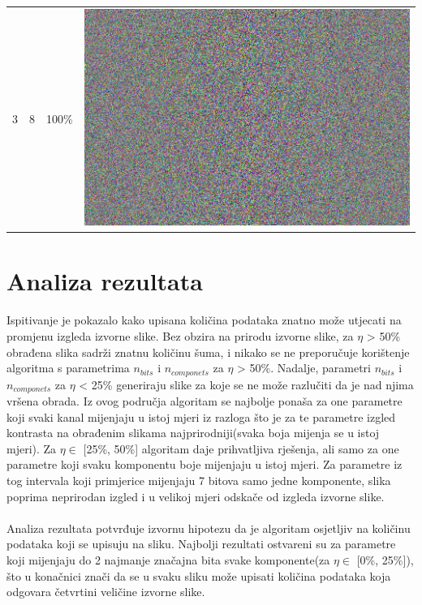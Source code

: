 \documentclass[times, utf8, seminar]{fer}
\begin{document}
\begin{center}
\begin{longtable}{|c|c|c|c|}
3 & 8 &100\% & \includegraphics[scale=0.3]{../benchmark_results/pattern/3_components-8_bits.png} \\
\end{longtable}
\end{center}

\section{Analiza rezultata}
\paragraph{}
Ispitivanje je pokazalo kako upisana količina podataka znatno može utjecati na promjenu izgleda izvorne slike. Bez obzira na prirodu izvorne slike, za $\eta$ > 50\% obrađena slika sadrži znatnu količinu šuma, i nikako se ne preporučuje korištenje algoritma s parametrima $n_{bits}$ i $n_{componets}$ za $\eta$ > 50\%. Nadalje, parametri $n_{bits}$ i $n_{componets}$ za $\eta$ < 25\% generiraju slike za koje se ne može razlučiti da je nad njima vršena obrada. Iz ovog područja algoritam se najbolje ponaša za one parametre koji svaki kanal mijenjaju u istoj mjeri iz razloga što je za te parametre izgled kontrasta na obrađenim slikama najprirodniji(svaka boja mijenja se u istoj mjeri). Za $\eta \in$ [25\%, 50\%] algoritam daje prihvatljiva rješenja, ali samo za one parametre koji svaku komponentu boje mijenjaju u istoj mjeri. Za parametre iz tog intervala koji primjerice mijenjaju 7 bitova samo jedne komponente, slika poprima neprirodan izgled i u velikoj mjeri odskače od izgleda izvorne slike.
\paragraph{}
Analiza rezultata potvrđuje izvornu hipotezu da je algoritam osjetljiv na količinu podataka koji se upisuju na sliku. Najbolji rezultati ostvareni su za parametre koji mijenjaju do 2 najmanje značajna bita svake komponente(za $\eta \in$ [0\%, 25\%]), što u konačnici znači da se u svaku sliku može upisati količina podataka koja odgovara četvrtini veličine izvorne slike.
\end{document}
